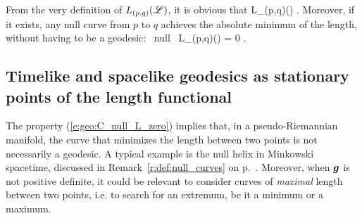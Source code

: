 From the very definition of $L_{(p,q)}(\mathscr{L})$, it is obvious that
\be
    L_{(p,q)}(\Li)  .
\ee
Moreover, if it exists, any null curve from $p$ to $q$ achieves the
absolute minimum of the length, without having to be a geodesic:
\be \label{e:geo:C_null_L_zero}
    \Li\mbox{ null } \Longrightarrow L_{(p,q)}(\Li) = 0 .
\ee

\subsection{Timelike and spacelike geodesics as stationary points
of the length functional} \label{s:geo:variation_length}

The property (\ref{e:geo:C_null_L_zero}) implies that, in a pseudo-Riemannian
manifold, the curve that minimizes the length between two points is not necessarily
a geodesic. A typical example is the null helix in Minkowski spacetime, discussed in
Remark~\ref{r:def:null_curves} on p.~\pageref{r:def:null_curves}. Moreover,
when $\bm{g}$ is not positive definite, it could be relevant to consider curves
of \emph{maximal} length between two points, i.e. to search for an extremum,
be it a minimum or a maximum.

